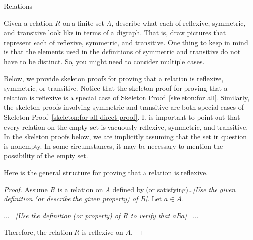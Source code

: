 \begin{section}{Relations}
%

\begin{problem}
Given a relation $R$ on a finite set $A$, describe what each of reflexive, symmetric, and transitive look like in terms of a digraph. That is, draw pictures that represent each of reflexive, symmetric, and transitive. One thing to keep in mind is that the elements used in the definitions of symmetric and transitive do not have to be distinct.  So, you might need to consider multiple cases.
\end{problem}


Below, we provide skeleton proofs for proving that a relation is reflexive, symmetric, or transitive.  Notice that the skeleton proof for proving that a relation is reflexive is a special case of Skeleton Proof~\ref{skeleton:for all}. Similarly, the skeleton proofs involving symmetric and transitive are both special cases of Skeleton Proof~\ref{skeleton:for all direct proof}. It is important to point out that every relation on the empty set is vacuously reflexive, symmetric, and transitive.  In the skeleton proofs below, we are implicitly assuming that the set in question is nonempty.  In some circumstances, it may be necessary to mention the possibility of the empty set.

\begin{skeleton}
Here is the general structure for proving that a relation is reflexive. 

\begin{mdframed}[style=skeleton]
\begin{proof}
Assume $R$ is a relation on $A$ defined by (or satisfying)\ldots \emph{[Use the given definition (or describe the given property) of $R$]}.  Let $a\in A$.
\begin{center}
$\ldots$ \ \emph{[Use the definition (or property) of $R$ to verify that $aR a$]} \ $\ldots$
\end{center}
\noindent Therefore, the relation $R$ is reflexive on $A$.
\end{proof}
\end{mdframed}
\end{skeleton}


\end{section}
